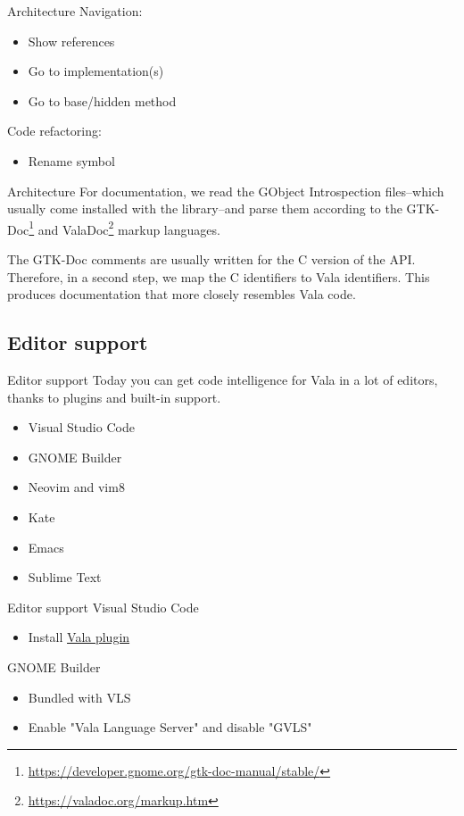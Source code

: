 \documentclass[t]{beamer}
\newcommand{\fancyurl}[1]{\href{#1}{#1}}
\begin{document}
\begin{frame}[c]{Architecture}
    Navigation:
    \begin{itemize}
        \item Show references
        \item Go to implementation(s)
        \item Go to base/hidden method
    \end{itemize}
    
    Code refactoring:
    \begin{itemize}
        \item Rename symbol
    \end{itemize}
\end{frame}

\begin{frame}[c]{Architecture}
    For documentation, we read the GObject Introspection files--which usually come installed with the library--and parse them according to the GTK-Doc\footnote{\fancyurl{https://developer.gnome.org/gtk-doc-manual/stable/}} and ValaDoc\footnote{\fancyurl{https://valadoc.org/markup.htm}} markup languages.
    
    The GTK-Doc comments are usually written for the C version of the API. Therefore, in a second step, we map the C identifiers to Vala identifiers. This produces documentation that more closely resembles Vala code.
\end{frame}

\subsection{Editor support}
\begin{frame}[c]{Editor support}
    Today you can get code intelligence for Vala in a lot of editors, thanks to plugins and built-in support.
    
    \begin{itemize}
        \item Visual Studio Code
        \item GNOME Builder
        \item Neovim and vim8
        \item Kate
        \item Emacs
        \item Sublime Text
    \end{itemize}
\end{frame}

\begin{frame}[c]{Editor support}
    Visual Studio Code
    \begin{itemize}
        \item Install \href{https://marketplace.visualstudio.com/items?itemName=prince781.vala}{Vala plugin}
    \end{itemize}
    
    GNOME Builder
    \begin{itemize}
        \item Bundled with VLS
        \item Enable "Vala Language Server" and disable "GVLS"
    \end{itemize}
\end{frame}
\end{document}
